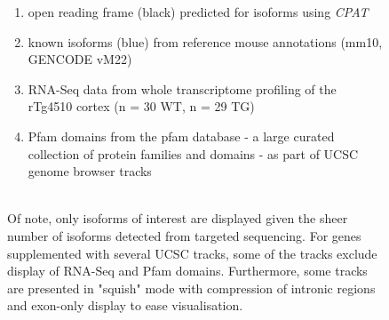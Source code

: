 \begin{figure}[htp]
{\begin{enumerate}[label=\textbf{(\Alph*)}]
		\item open reading frame (black) predicted for isoforms using \textit{CPAT} 
		\item known isoforms (blue) from reference mouse annotations (mm10, GENCODE vM22)
		\item RNA-Seq data from whole transcriptome profiling of the rTg4510 cortex\cite{Castanho2020} (n = 30 WT, n = 29 TG)
		\item Pfam domains from the pfam database - a large curated collection of protein families and domains - as part of UCSC genome browser tracks	
		\\ \\	
	\end{enumerate} 

	Of note, only isoforms of interest are displayed given the sheer number of isoforms detected from targeted sequencing. For genes supplemented with several UCSC tracks, some of the tracks exclude display of RNA-Seq and Pfam domains. Furthermore, some tracks are presented in "squish" mode with compression of intronic regions and exon-only display to ease visualisation. 
	}   
	\label{fig:eg_track}
\end{figure}

